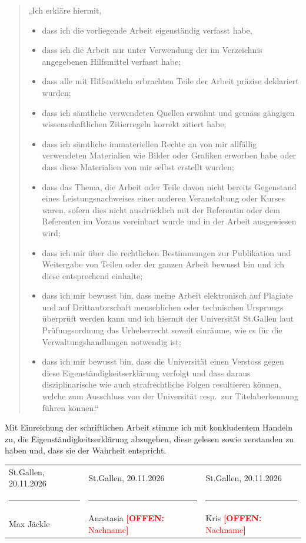 \documentclass[11pt,a4paper]{article}
\newcommand{\offen}[1]{\textcolor{red}{\textbf{[OFFEN:} #1\textbf{]}}}
\begin{document}
\begin{quote}
„Ich erkläre hiermit,
\begin{itemize}
\item dass ich die vorliegende Arbeit eigenständig verfasst habe,
\item dass ich die Arbeit nur unter Verwendung der im Verzeichnis angegebenen Hilfsmittel verfasst habe;
\item dass alle mit Hilfsmitteln erbrachten Teile der Arbeit präzise deklariert wurden;
\item dass ich sämtliche verwendeten Quellen erwähnt und gemäss gängigen wissenschaftlichen Zitierregeln korrekt
  zitiert habe;
\item dass ich sämtliche immateriellen Rechte an von mir allfällig verwendeten Materialien wie Bilder oder Grafiken
  erworben habe oder dass diese Materialien von mir selbst erstellt wurden;
\item dass das Thema, die Arbeit oder Teile davon nicht bereits Gegenstand eines Leistungsnachweises einer anderen
  Veranstaltung oder Kurses waren, sofern dies nicht ausdrücklich mit der Referentin oder dem Referenten im Voraus
  vereinbart wurde und in der Arbeit ausgewiesen wird;
\item dass ich mir über die rechtlichen Bestimmungen zur Publikation und Weitergabe von Teilen oder der ganzen
  Arbeit bewusst bin und ich diese entsprechend einhalte;
\item dass ich mir bewusst bin, dass meine Arbeit elektronisch auf Plagiate und auf Drittautorschaft menschlichen
  oder technischen Ursprungs überprüft werden kann und ich hiermit der Universität St.Gallen laut Prüfungsordnung
  das Urheberrecht soweit einräume, wie es für die Verwaltungshandlungen notwendig ist;
\item dass ich mir bewusst bin, dass die Universität einen Verstoss gegen diese Eigenständigkeitserklärung verfolgt
  und dass daraus disziplinarische wie auch strafrechtliche Folgen resultieren können, welche zum Ausschluss von
  der Universität resp.\ zur Titelaberkennung führen können.“
\end{itemize}
\end{quote}

Mit Einreichung der schriftlichen Arbeit stimme ich mit konkludentem Handeln zu, die Eigenständigkeitserklärung
abzugeben, diese gelesen sowie verstanden zu haben und, dass sie der Wahrheit entspricht.

\normalsize
\vspace{2em}
\begin{tabularx}{\linewidth}{@{}X X X@{}}
St.Gallen, 20.11.2026 & St.Gallen, 20.11.2026 & St.Gallen, 20.11.2026 \\[2.5em]
\rule{0.9\linewidth}{0.4pt} & \rule{0.9\linewidth}{0.4pt} & \rule{0.9\linewidth}{0.4pt} \\
Max Jäckle & Anastasia \offen{Nachname} & Kris \offen{Nachname} \\
\end{tabularx}
\end{document}

